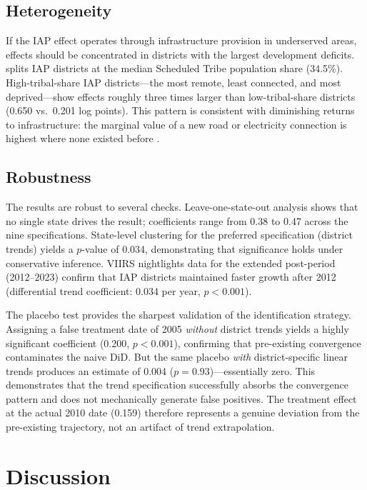 \documentclass[12pt]{article}
\begin{document}
\subsection{Heterogeneity}



If the IAP effect operates through infrastructure provision in underserved areas, effects should be concentrated in districts with the largest development deficits.  splits IAP districts at the median Scheduled Tribe population share (34.5\%). High-tribal-share IAP districts---the most remote, least connected, and most deprived---show effects roughly three times larger than low-tribal-share districts (0.650 vs.\ 0.201 log points). This pattern is consistent with diminishing returns to infrastructure: the marginal value of a new road or electricity connection is highest where none existed before \citep{asher2020}.

\subsection{Robustness}

The results are robust to several checks. Leave-one-state-out analysis shows that no single state drives the result; coefficients range from 0.38 to 0.47 across the nine specifications. State-level clustering for the preferred specification (district trends) yields a $p$-value of 0.034, demonstrating that significance holds under conservative inference. VIIRS nightlights data for the extended post-period (2012--2023) confirm that IAP districts maintained faster growth after 2012 (differential trend coefficient: 0.034 per year, $p < 0.001$).

The placebo test provides the sharpest validation of the identification strategy. Assigning a false treatment date of 2005 \textit{without} district trends yields a highly significant coefficient (0.200, $p < 0.001$), confirming that pre-existing convergence contaminates the naive DiD. But the same placebo \textit{with} district-specific linear trends produces an estimate of 0.004 ($p = 0.93$)---essentially zero. This demonstrates that the trend specification successfully absorbs the convergence pattern and does not mechanically generate false positives. The treatment effect at the actual 2010 date (0.159) therefore represents a genuine deviation from the pre-existing trajectory, not an artifact of trend extrapolation.

\section{Discussion}
\end{document}
